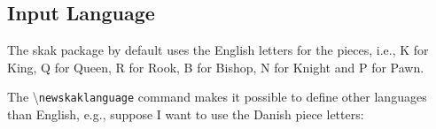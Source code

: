 \documentclass[10pt]{article}
\newcommand{\package}[1]{\textsf{#1}}
\newcommand{\command}[1]{\textbackslash\texttt{#1}}
\begin{document}
\subsection{Input Language}
\label{sec:input-language}

The \package{skak} package by default uses the English letters for the
pieces, i.e., K for King, Q for Queen, R for Rook, B for Bishop, N for
Knight and P for Pawn.

The \command{newskaklanguage} command makes it possible to define
other languages than English, e.g., suppose I want to use the Danish
piece letters:

\begin{LTXexample}

\skaklanguage[danish]

\newgame
{}
\end{LTXexample}
\end{document}
